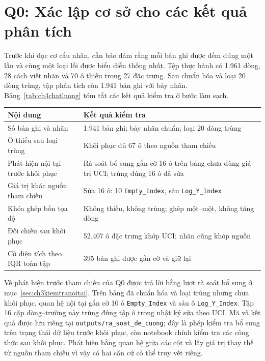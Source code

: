 \documentclass[12pt,a4paper,oneside]{report}
\newcommand{\maCot}[1]{{\urlstyle{tt}\def\UrlBreaks{\do\_\do\/\do\.}\def\UrlBigBreaks{}\nolinkurl{#1}}}
\begin{document}
\section{Q0: Xác lập cơ sở cho các kết quả phân tích}
\label{sec:ch4q0}

Trước khi đọc cơ cấu nhãn, cần bảo đảm rằng mỗi bản ghi được đếm đúng một lần và cùng một loại lỗi được biểu diễn thống nhất. Tệp thực hành có 1.961 dòng, 28 cách viết nhãn và 70 ô thiếu trong 27 đặc trưng. Sau chuẩn hóa và loại 20 dòng trùng, tập phân tích còn 1.941 bản ghi với bảy nhãn. Bảng~\ref{tab:ch4chatluong} tóm tắt các kết quả kiểm tra ở bước làm sạch.

\begin{center}\begin{minipage}{\linewidth}
\label{tab:ch4chatluong}
\small{}
\begin{tabularx}{\linewidth}{@{}Y Y@{}}
\toprule
Nội dung & Kết quả kiểm tra \\
\midrule
Số bản ghi và nhãn & 1.941 bản ghi; bảy nhãn chuẩn; loại 20 dòng trùng \\
Ô thiếu sau loại trùng & Khôi phục đủ 67 ô theo nguồn tham chiếu \\
Phát hiện nội tại trước khôi phục & Rà soát bổ sung gắn cờ 16 ô trên bảng chưa dùng giá trị UCI; trùng đúng 16 ô đã sửa \\
Giá trị khác nguồn tham chiếu & Sửa 16 ô: 10 \maCot{Empty_Index}, sáu \maCot{Log_Y_Index} \\
Khóa ghép bốn tọa độ & Không thiếu, không trùng; ghép một--một, không tăng dòng \\
Đối chiếu sau khôi phục & 52.407 ô đặc trưng khớp UCI; nhãn cũng khớp nguồn \\
Cờ diện tích theo IQR toàn tập & 395 bản ghi được gắn cờ và giữ lại \\
\bottomrule
\end{tabularx}
\end{minipage}\end{center}

Vế phát hiện trước tham chiếu của Q0 được trả lời bằng lượt rà soát bổ sung ở mục~\ref{sec:ch3kiemtranoitai}. Trên bảng đã chuẩn hóa và loại trùng nhưng chưa khôi phục, quan hệ nội tại gắn cờ 10 ô \maCot{Empty_Index} và sáu ô \maCot{Log_Y_Index}. Tập 16 cặp dòng--trường này trùng đúng tập ô trong nhật ký sửa theo UCI. Mã và kết quả được lưu riêng tại \maCot{outputs/ra_soat_de_cuong}; đây là phép kiểm tra bổ sung trên trạng thái dữ liệu trước khôi phục, còn notebook chính kiểm tra các công thức sau khôi phục. Phát hiện bằng quan hệ giữa các cột và lấy giá trị thay thế từ nguồn tham chiếu vì vậy có hai căn cứ có thể truy vết riêng.
\end{document}
